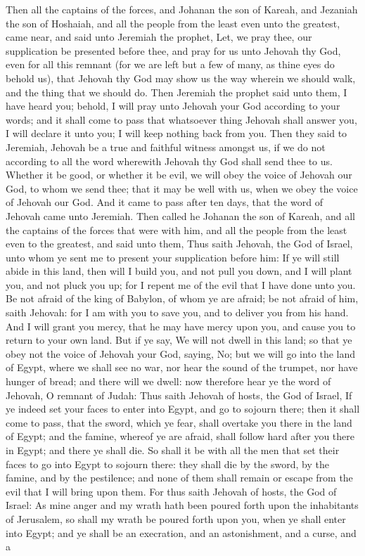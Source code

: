 Then all the captains of the forces, and Johanan the son of Kareah, and Jezaniah the son of Hoshaiah, and all the people from the least even unto the greatest, came near, and said unto Jeremiah the prophet, Let, we pray thee, our supplication be presented before thee, and pray for us unto Jehovah thy God, even for all this remnant (for we are left but a few of many, as thine eyes do behold us), that Jehovah thy God may show us the way wherein we should walk, and the thing that we should do. Then Jeremiah the prophet said unto them, I have heard you; behold, I will pray unto Jehovah your God according to your words; and it shall come to pass that whatsoever thing Jehovah shall answer you, I will declare it unto you; I will keep nothing back from you. Then they said to Jeremiah, Jehovah be a true and faithful witness amongst us, if we do not according to all the word wherewith Jehovah thy God shall send thee to us. Whether it be good, or whether it be evil, we will obey the voice of Jehovah our God, to whom we send thee; that it may be well with us, when we obey the voice of Jehovah our God.  And it came to pass after ten days, that the word of Jehovah came unto Jeremiah. Then called he Johanan the son of Kareah, and all the captains of the forces that were with him, and all the people from the least even to the greatest, and said unto them, Thus saith Jehovah, the God of Israel, unto whom ye sent me to present your supplication before him: If ye will still abide in this land, then will I build you, and not pull you down, and I will plant you, and not pluck you up; for I repent me of the evil that I have done unto you. Be not afraid of the king of Babylon, of whom ye are afraid; be not afraid of him, saith Jehovah: for I am with you to save you, and to deliver you from his hand. And I will grant you mercy, that he may have mercy upon you, and cause you to return to your own land. But if ye say, We will not dwell in this land; so that ye obey not the voice of Jehovah your God, saying, No; but we will go into the land of Egypt, where we shall see no war, nor hear the sound of the trumpet, nor have hunger of bread; and there will we dwell: now therefore hear ye the word of Jehovah, O remnant of Judah: Thus saith Jehovah of hosts, the God of Israel, If ye indeed set your faces to enter into Egypt, and go to sojourn there; then it shall come to pass, that the sword, which ye fear, shall overtake you there in the land of Egypt; and the famine, whereof ye are afraid, shall follow hard after you there in Egypt; and there ye shall die. So shall it be with all the men that set their faces to go into Egypt to sojourn there: they shall die by the sword, by the famine, and by the pestilence; and none of them shall remain or escape from the evil that I will bring upon them.  For thus saith Jehovah of hosts, the God of Israel: As mine anger and my wrath hath been poured forth upon the inhabitants of Jerusalem, so shall my wrath be poured forth upon you, when ye shall enter into Egypt; and ye shall be an execration, and an astonishment, and a curse, and a 